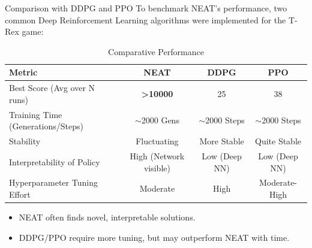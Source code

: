 \documentclass{beamer}
\begin{document}
\begin{frame}{Comparison with DDPG and PPO}
To benchmark NEAT's performance, two common Deep Reinforcement Learning algorithms were implemented for the T-Rex game:

\begin{table}[h!]
  \centering
  \caption{Comparative Performance}
  \begin{adjustbox}{max width=\linewidth}
    \begin{tabular}{lccc}
    \toprule
    \textbf{Metric} & \textbf{NEAT} & \textbf{DDPG} & \textbf{PPO} \\
    \midrule
    Best Score (Avg over N runs) & \textbf{>10000} & 25 & 38 \\
    Training Time (Generations/Steps) & $\sim$2000 Gens & $\sim$2000 Steps & $\sim$2000 Steps \\
    Stability & Fluctuating & More Stable & Quite Stable \\
    Interpretability of Policy & High (Network visible) & Low (Deep NN) & Low (Deep NN) \\
    Hyperparameter Tuning Effort & Moderate & High & Moderate-High \\
    \bottomrule
    \end{tabular}
  \end{adjustbox}
\end{table}

\vspace{-0.2cm}
\begin{itemize}
  \item NEAT often finds novel, interpretable solutions.
  \item DDPG/PPO require more tuning, but may outperform NEAT with time.
\end{itemize}
\end{frame}
\end{document}
